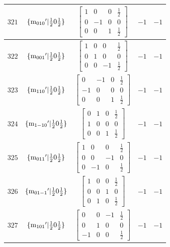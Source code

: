 \documentclass[fleqn,8pt]{jsarticle}
\begin{document}
\begin{longtable}{ccccc}
$ 321 $ & $ \{{\rm m}_{010}{}'|\frac{1}{2} 0 \frac{1}{2}\} $ & $ \begin{bmatrix} 1 & 0 & 0 & \frac{1}{2} \\ 0 & -1 & 0 & 0 \\ 0 & 0 & 1 & \frac{1}{2} \end{bmatrix} $ & $ -1 $ & $ -1 $ \\ \hline
$ 322 $ & $ \{{\rm m}_{001}{}'|\frac{1}{2} 0 \frac{1}{2}\} $ & $ \begin{bmatrix} 1 & 0 & 0 & \frac{1}{2} \\ 0 & 1 & 0 & 0 \\ 0 & 0 & -1 & \frac{1}{2} \end{bmatrix} $ & $ -1 $ & $ -1 $ \\ \hline
$ 323 $ & $ \{{\rm m}_{110}{}'|\frac{1}{2} 0 \frac{1}{2}\} $ & $ \begin{bmatrix} 0 & -1 & 0 & \frac{1}{2} \\ -1 & 0 & 0 & 0 \\ 0 & 0 & 1 & \frac{1}{2} \end{bmatrix} $ & $ -1 $ & $ -1 $ \\ \hline
$ 324 $ & $ \{{\rm m}_{1-10}{}'|\frac{1}{2} 0 \frac{1}{2}\} $ & $ \begin{bmatrix} 0 & 1 & 0 & \frac{1}{2} \\ 1 & 0 & 0 & 0 \\ 0 & 0 & 1 & \frac{1}{2} \end{bmatrix} $ & $ -1 $ & $ -1 $ \\ \hline
$ 325 $ & $ \{{\rm m}_{011}{}'|\frac{1}{2} 0 \frac{1}{2}\} $ & $ \begin{bmatrix} 1 & 0 & 0 & \frac{1}{2} \\ 0 & 0 & -1 & 0 \\ 0 & -1 & 0 & \frac{1}{2} \end{bmatrix} $ & $ -1 $ & $ -1 $ \\ \hline
$ 326 $ & $ \{{\rm m}_{01-1}{}'|\frac{1}{2} 0 \frac{1}{2}\} $ & $ \begin{bmatrix} 1 & 0 & 0 & \frac{1}{2} \\ 0 & 0 & 1 & 0 \\ 0 & 1 & 0 & \frac{1}{2} \end{bmatrix} $ & $ -1 $ & $ -1 $ \\ \hline
$ 327 $ & $ \{{\rm m}_{101}{}'|\frac{1}{2} 0 \frac{1}{2}\} $ & $ \begin{bmatrix} 0 & 0 & -1 & \frac{1}{2} \\ 0 & 1 & 0 & 0 \\ -1 & 0 & 0 & \frac{1}{2} \end{bmatrix} $ & $ -1 $ & $ -1 $ \\ \hline

\end{longtable}
\end{document}
